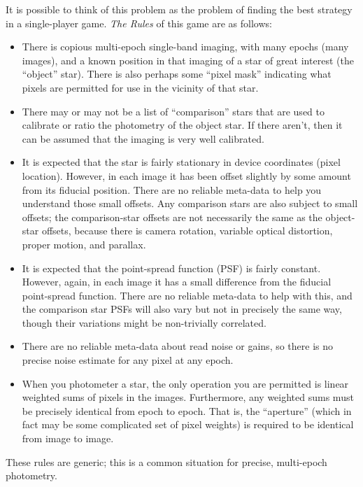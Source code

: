 \documentclass[12pt, letterpaper, preprint]{aastex}
\begin{document}
It is possible to think of this problem as the problem of finding the best strategy in a single-player game.
\emph{The Rules} of this game are as follows:
\begin{itemize}
\item
  There is copious multi-epoch single-band imaging,
  with many epochs (many images),
  and a known position in that imaging of a star of great interest (the ``object'' star).
  There is also perhaps some ``pixel mask'' indicating what pixels are permitted for use
  in the vicinity of that star.
\item
  There may or may not be a list of ``comparison'' stars
  that are used to calibrate or ratio the photometry of the object star.
  If there aren't, then it can be assumed that the imaging is very well calibrated.
\item
  It is expected that the star is fairly stationary in device coordinates (pixel location).
  However, in each image it has been offset slightly by some amount from its fiducial position.
  There are no reliable meta-data to help you understand those small offsets.
  Any comparison stars are also subject to small offsets;
  the comparison-star offsets are not necessarily the same as the object-star offsets,
  because there is camera rotation, variable optical distortion, proper motion, and parallax.
\item
  It is expected that the point-spread function (PSF) is fairly constant.
  However, again, in each image it has a small difference from the fiducial point-spread function.
  There are no reliable meta-data to help with this,
  and the comparison star PSFs will also vary but not in precisely the same way,
  though their variations might be non-trivially correlated.
\item
  There are no reliable meta-data about read noise or gains,
  so there is no precise noise estimate for any pixel at any epoch.
\item
  When you photometer a star,
  the only operation you are permitted is linear weighted sums of pixels in the images.
  Furthermore, any weighted sums must be precisely identical from epoch to epoch.
  That is, the ``aperture''
  (which in fact may be some complicated set of pixel weights)
  is required to be identical from image to image.
\end{itemize}
These rules are generic;
  this is a common situation for precise, multi-epoch photometry.
\end{document}
